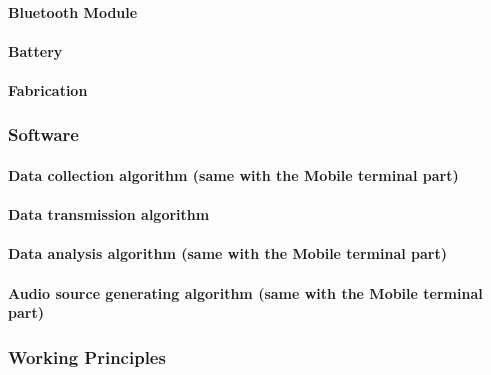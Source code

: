 \paragraph{Bluetooth Module}
\paragraph{Battery}
\paragraph{Fabrication}
\subsubsection{Software}
\paragraph{Data collection algorithm (same with the Mobile terminal part)}
\paragraph{Data transmission algorithm}
\paragraph{Data analysis algorithm (same with the Mobile terminal part)}
\paragraph{Audio source generating algorithm (same with the Mobile terminal
  part)} 
\subsubsection{Working Principles}